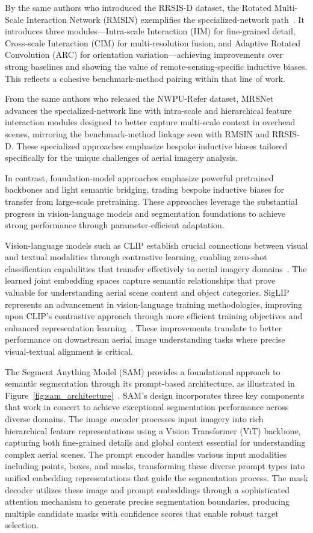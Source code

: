 By the same authors who introduced the RRSIS-D dataset, the Rotated Multi-Scale Interaction Network (RMSIN) exemplifies the specialized-network path~\cite{liu2024rotated}. It introduces three modules—Intra-scale Interaction (IIM) for fine-grained detail, Cross-scale Interaction (CIM) for multi-resolution fusion, and Adaptive Rotated Convolution (ARC) for orientation variation—achieving improvements over strong baselines and showing the value of remote-sensing-specific inductive biases. This reflects a cohesive benchmark-method pairing within that line of work.

From the same authors who released the NWPU-Refer dataset, MRSNet advances the specialized-network line with intra-scale and hierarchical feature interaction modules designed to better capture multi-scale context in overhead scenes, mirroring the benchmark-method linkage seen with RMSIN and RRSIS-D. These specialized approaches emphasize bespoke inductive biases tailored specifically for the unique challenges of aerial imagery analysis.

In contrast, foundation-model approaches emphasize powerful pretrained backbones and light semantic bridging, trading bespoke inductive biases for transfer from large-scale pretraining. These approaches leverage the substantial progress in vision-language models and segmentation foundations to achieve strong performance through parameter-efficient adaptation.

Vision-language models such as CLIP establish crucial connections between visual and textual modalities through contrastive learning, enabling zero-shot classification capabilities that transfer effectively to aerial imagery domains~\cite{clip}. The learned joint embedding spaces capture semantic relationships that prove valuable for understanding aerial scene content and object categories. SigLIP represents an advancement in vision-language training methodologies, improving upon CLIP's contrastive approach through more efficient training objectives and enhanced representation learning~\cite{siglip,siglip2}. These improvements translate to better performance on downstream aerial image understanding tasks where precise visual-textual alignment is critical.

The Segment Anything Model (SAM) provides a foundational approach to semantic segmentation through its prompt-based architecture, as illustrated in Figure~\ref{fig:sam_architecture}~\cite{sam}. SAM's design incorporates three key components that work in concert to achieve exceptional segmentation performance across diverse domains. The image encoder processes input imagery into rich hierarchical feature representations using a Vision Transformer (ViT) backbone, capturing both fine-grained details and global context essential for understanding complex aerial scenes. The prompt encoder handles various input modalities including points, boxes, and masks, transforming these diverse prompt types into unified embedding representations that guide the segmentation process. The mask decoder utilizes these image and prompt embeddings through a sophisticated attention mechanism to generate precise segmentation boundaries, producing multiple candidate masks with confidence scores that enable robust target selection.

